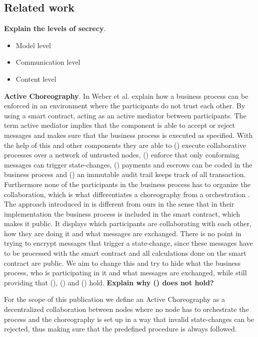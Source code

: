 \documentclass[runningheads]{llncs}
\newcommand{\rom}[1]{(\uppercase\expandafter{\romannumeral #1\relax})}  %
\begin{document}
\subsection{Related work} \label{sec:rel_work}




\bigbreak
\textbf{Explain the levels of secrecy}. 
\begin{itemize}
    \item Model level
    \item Communication level
    \item Content level
\end{itemize}
\cite{ladleif}




\bigbreak
\textbf{Active Choreography}. In \cite{weber2016untrusted} Weber et al. explain how a business process can be enforced in an environment where the participants do not trust each other. By using a smart contract, acting as an active mediator between participants. The term active mediator implies that the component is able to accept or reject messages and makes sure that the business process is executed as specified. With the help of this and other components they are able to \rom{1} execute collaborative processes over a network of untrusted nodes, \rom{2} enforce that only conforming messages can trigger state-changes, \rom{3} payments and escrows can be coded in the business process and \rom{4} an immutable audit trail keeps track of all transaction. Furthermore none of the participants in the business process has to organize the collaboration, which is what differentiates a choreography from a orchestration \cite{some_source}. The approach introduced in \cite{weber2016untrusted} is different from ours in the sense that in their implementation the business process is included in the smart contract, which makes it public. It displays which participants are collaborating with each other, how they are doing it and what messages are exchanged. There is no point in trying to encrypt messages that trigger a state-change, since these messages have to be processed with the smart contract and all calculations done on the smart contract are public. We aim to change this and try to hide what the business process, who is participating in it and what messages are exchanged, while still providing that \rom{1}, \rom{2} and \rom{4} hold. \textbf{Explain why \rom{3} does not hold?}

For the scope of this publication we define an Active Choreography as a decentralized collaboration between nodes where no node has to orchestrate the process and the choreography is set up in a way that invalid state-changes can be rejected, thus making sure that the predefined procedure is always followed. 
\end{document}
